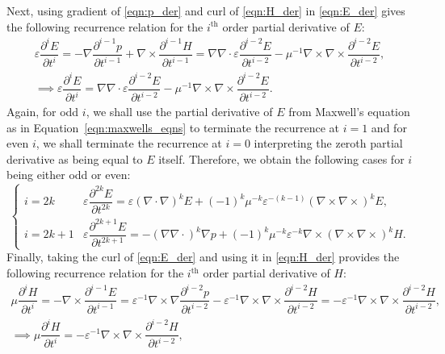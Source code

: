 \documentclass{amsart}
\theoremstyle{thmstyleone}%
\theoremstyle{thmstyletwo}%
\theoremstyle{thmstylethree}%
\begin{document}
\noindent
Next, using gradient of \eqref{eqn:p_der} and curl of \eqref{eqn:H_der} in \eqref{eqn:E_der} gives the following recurrence relation for the $i^{\text{th}}$ order partial derivative of $E$:
\[ 
  \begin{gathered}
\varepsilon \dfrac{\partial^i E}{\partial t^i} = -\nabla \dfrac{\partial^{i-1} p}{\partial t^{i-1}} + \nabla \times \dfrac{\partial^{i-1} H}{\partial t^{i-1}} = \nabla \nabla \cdot \varepsilon \dfrac{\partial^{i-2} E}{\partial t^{i-2}} - \mu^{-1} \nabla \times \nabla \times \dfrac{\partial^{i-2} E}{\partial t^{i-2}}, \\
\implies \varepsilon \dfrac{\partial^i E}{\partial t^i} =  \nabla \nabla \cdot \varepsilon \dfrac{\partial^{i-2} E}{\partial t^{i-2}} - \mu^{-1} \nabla \times \nabla \times \dfrac{\partial^{i-2} E}{\partial t^{i-2}}.
  \end{gathered}
\] 
Again, for odd $i$, we shall use the partial derivative of $E$ from Maxwell's equation as in Equation~\eqref{eqn:maxwells_eqns} to terminate the recurrence at $i = 1$ and for even $i$, we shall terminate the recurrence at $i = 0$ interpreting the zeroth partial derivative as being equal to $E$ itself. Therefore, we obtain the following cases for $i$ being either odd or even:
\begin{equation}
\begin{cases}
i = 2k & \varepsilon \dfrac{\partial^{2k} E}{\partial t^{2k}} =\varepsilon ( \nabla \cdot \nabla)^k E + (-1)^k \mu^{-k} \varepsilon^{-(k-1)} \left(\nabla \times \nabla \times\right)^k E, \\
i = 2k+1 & \varepsilon \dfrac{\partial^{2k+1} E}{\partial t^{2k+1}} = -( \nabla \nabla \cdot)^k \nabla p + (-1)^k \mu^{-k} \varepsilon^{-k} \nabla \times (\nabla \times \nabla \times)^k H.
\end{cases} \label{eqn:E_derivative}
\end{equation}
\noindent
Finally, taking the curl of \eqref{eqn:E_der} and using it in \eqref{eqn:H_der} provides the following recurrence relation for the $i^{\text{th}}$ order partial derivative of $H$:
 \[
   \begin{gathered}
 \mu \dfrac{\partial^i H}{\partial t^i} = - \nabla \times  \dfrac{\partial^{i-1} E}{\partial t^{i-1}} =  \varepsilon^{-1} \nabla \times \nabla \dfrac{\partial^{i-2} p}{\partial t^{i-2}} - \varepsilon^{-1} \nabla \times \nabla \times \dfrac{\partial^{i-2} H}{\partial t^{i-2}} =  - \varepsilon^{-1} \nabla \times \nabla \times \dfrac{\partial^{i-2} H}{\partial t^{i-2}}, \\
 \implies \mu \dfrac{\partial^i H}{\partial t^i} = - \varepsilon^{-1} \nabla \times \nabla \times \dfrac{\partial^{i-2} H}{\partial t^{i-2}},
   \end{gathered}
\]
\end{document}
